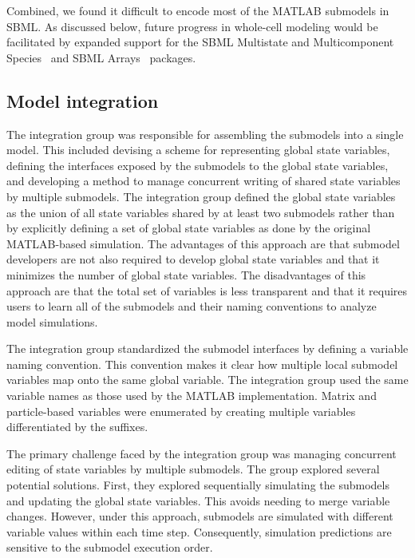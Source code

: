 \documentclass[journal,transmag]{IEEEtran}
\begin{document}
Combined, we found it difficult to encode most of the MATLAB submodels in SBML. As discussed below, future progress in whole-cell modeling would be facilitated by expanded support for the SBML Multistate and Multicomponent Species~\cite{SBMLMulti} and SBML Arrays~\cite{SBMLArrays} packages.

\subsection{Model integration}
The integration group was responsible for assembling the submodels into a single model. This included devising a scheme for representing global state variables, defining the interfaces exposed by the submodels to the global state variables, and developing a method to manage concurrent writing of shared state variables by multiple submodels. The integration group defined the global state variables as the union of all state variables shared by at least two submodels rather than by explicitly defining a set of global state variables as done by the original MATLAB-based simulation. The advantages of this approach are that submodel developers are not also required to develop global state variables and that it minimizes the number of global state variables. The disadvantages of this approach are that the total set of variables is less transparent and that it requires users to learn all of the submodels and their naming conventions to analyze model simulations.

The integration group standardized the submodel interfaces by defining a variable naming convention. This convention makes it clear how multiple local submodel variables map onto the same global variable. The integration group used the same variable names as those used by the MATLAB implementation. Matrix and particle-based variables were enumerated by creating multiple variables differentiated by the suffixes.

The primary challenge faced by the integration group was managing concurrent editing of state variables by multiple submodels. The group explored several potential solutions. First, they explored sequentially simulating the submodels and updating the global state variables. This avoids needing to merge variable changes. However, under this approach, submodels are simulated with different variable values within each time step. Consequently, simulation predictions are sensitive to the submodel execution order. 
\end{document}
